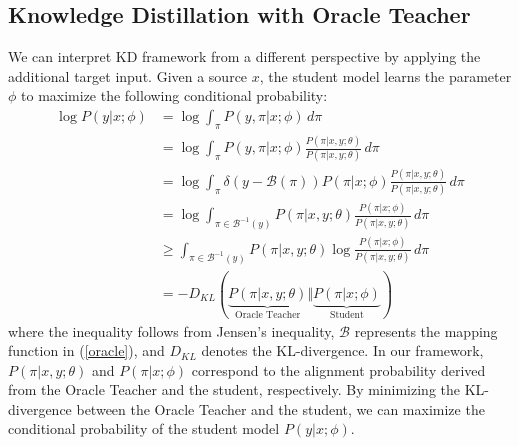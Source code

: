 \documentclass[journal]{IEEEtran}
\begin{document}
\subsection{Knowledge Distillation with Oracle Teacher} 
\label{oracle_kd_section}
We can interpret KD framework from a different perspective by applying the additional target input.
Given a source $x$, the student model learns the parameter $\phi$ to maximize the following conditional probability:
\begin{align}
\label{kl}
  \log P(y|x;\phi) & = \log\int_{\pi}P(y,\pi|x;\phi)\,d\pi  \nonumber \\
    & = \log\int_{\pi}P(y,\pi|x;\phi)\frac{P(\pi|x,y;\theta)}{P(\pi|x,y;\theta)}\,d\pi \nonumber \\
  & = \log\int_{\pi}\delta(y-\mathcal{B}(\pi))P(\pi|x;\phi)\frac{P(\pi|x,y;\theta)}{P(\pi|x,y;\theta)}\,d\pi \nonumber \\
 & = \log\int_{\pi\in\mathcal{B}^{-1}(y)}P(\pi|x,y;\theta)\frac{P(\pi|x;\phi)}{P(\pi|x,y;\theta)}\,d\pi \nonumber \\
  & \geq \int_{\pi\in\mathcal{B}^{-1}(y)}P(\pi|x,y;\theta)\log\frac{P(\pi|x;\phi)}{P(\pi|x,y;\theta)}\,d\pi  \nonumber \\
  & = - D_{KL}(\underbrace{P(\pi|x,y;\theta)}_{\text{Oracle Teacher}} \Vert \underbrace{P(\pi|x;\phi)}_{\text{Student}}) 
\end{align}%
where the inequality follows from Jensen’s inequality, $\mathcal{B}$ represents the mapping function in (\ref{oracle}), and $D_{KL}$ denotes the KL-divergence. 
In our framework, $P(\pi|x,y;\theta)$ and $P(\pi|x;\phi)$ correspond to the alignment probability derived from the Oracle Teacher and the student, respectively.
By minimizing the KL-divergence between the Oracle Teacher and the student, we can maximize the conditional probability of the student model $P(y|x;\phi)$.
\end{document}
